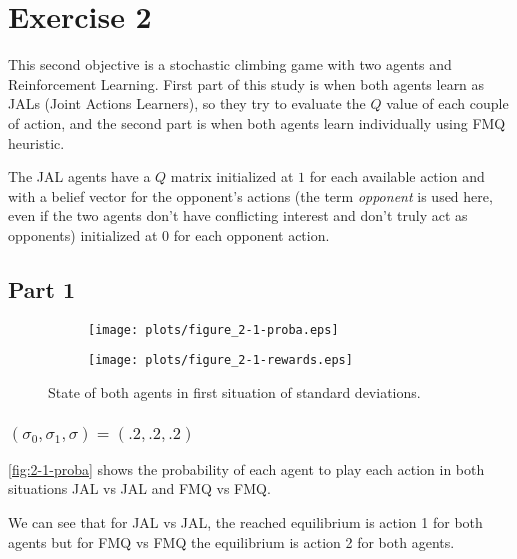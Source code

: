 \documentclass{article}
\begin{document}
\section{Exercise 2}

This second objective is a stochastic climbing game with two agents and Reinforcement Learning. First part of this study is
when both agents learn as JALs (Joint Actions Learners), so they try to evaluate the $Q$ value of each couple of action, and
the second part is when both agents learn individually using FMQ heuristic.

The JAL agents have a $Q$ matrix initialized at $1$ for each available action and with a belief vector for the opponent's actions
(the term \textit{opponent} is used here, even if the two agents don't have conflicting interest and don't truly act as opponents)
initialized at $0$ for each opponent action.

\subsection{Part 1}

\begin{figure}[!t]
\begin{subfigure}{\textwidth}
	\hspace{-2cm}
	\texttt{[image: plots/figure\_2-1-proba.eps]}
\end{subfigure}
\begin{subfigure}{\textwidth}
	\hspace{-2cm}
	\texttt{[image: plots/figure\_2-1-rewards.eps]}
\end{subfigure}
\caption{State of both agents in first situation of standard deviations.}
\end{figure}

\newpage
\subsubsection{$(\sigma_0, \sigma_1, \sigma) = (.2, .2, .2)$}

\autoref{fig:2-1-proba} shows the probability of each agent to play each action in both situations JAL vs JAL and FMQ vs FMQ.

We can see that for JAL vs JAL, the reached equilibrium is action 1 for both agents but for FMQ vs FMQ the equilibrium is action
2 for both agents.
\end{document}
